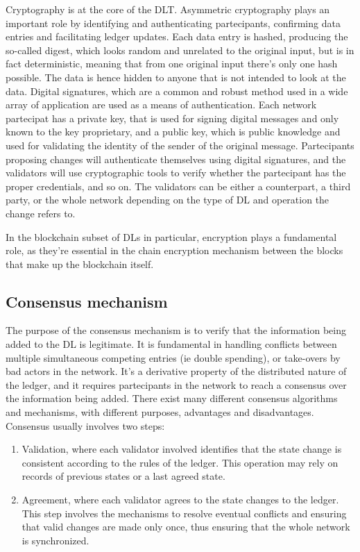Cryptography is at the core of the DLT. Asymmetric cryptography plays an important role by identifying and authenticating partecipants, confirming data entries and facilitating ledger updates.
Each data entry is hashed, producing the so-called digest, which looks random and unrelated to the original input, but is in fact deterministic, meaning that from one original input there's only one hash possible. The data is hence hidden to anyone that is not intended to look at the data. Digital signatures, which are a common and robust method used in a wide array of application are used as a means of authentication. Each network partecipat has a private key, that is used for signing digital messages and only known to the key proprietary, and a public key, which is public knowledge and used for validating the identity of the sender of the original message.
Partecipants proposing changes will authenticate themselves using digital signatures, and the validators will use cryptographic tools to verify whether the partecipant has the proper credentials, and so on. The validators can be either a counterpart, a third party, or the whole network depending on the type of DL and operation the change refers to.

In the blockchain subset of DLs in particular, encryption plays a fundamental role, as they're essential in the chain encryption mechanism between the blocks that make up the blockchain itself.


\subsection{Consensus mechanism}
\label{sec:consensus}
The purpose of the consensus mechanism is to verify that the information being added to the DL is legitimate. It is fundamental in handling conflicts between multiple simultaneous competing entries (ie double spending), or take-overs by bad actors in the network. It's a derivative property of the distributed nature of the ledger, and it requires partecipants in the network to reach a consensus over the information being added. There exist many different consensus algorithms and mechanisms, with different purposes, advantages and disadvantages. \\

Consensus usually involves two steps:
\begin{enumerate}
    \item Validation, where each validator involved identifies that the state change is consistent according to the rules of the ledger. This operation may rely on records of previous states or a last agreed state.
    \item Agreement, where each validator agrees to the state changes to the ledger. This step involves the mechanisms to resolve eventual conflicts and ensuring that valid changes are made only once, thus ensuring that the whole network is synchronized.
\end{enumerate}


